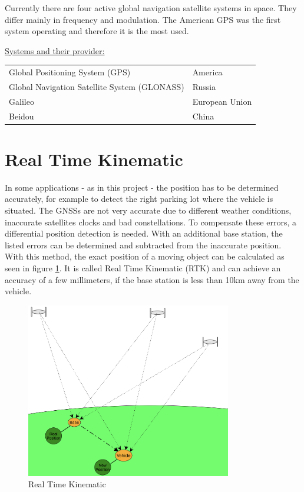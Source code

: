 Currently there are four active global navigation satellite systems in space. They differ mainly in frequency and modulation. The American GPS was the first system operating and therefore it is the most used. \cite{WsCommScript}

\newpage

\par
\underline{\large Systems and their provider:}\\

\begin{tabular}{ll}
	Global Positioning System (GPS) & America \\
	Global Navigation Satellite System (GLONASS) & Russia \\
	Galileo & European Union \\
	Beidou & China 
\end{tabular}

\section{Real Time Kinematic}

In some applications - as in this project - the position has to be determined accurately, for example to detect the right parking lot where the vehicle is situated. The GNSSs are not very accurate due to different weather conditions, inaccurate satellites clocks and bad constellations. To compensate these errors, a differential position detection is needed. With an additional base station, the listed errors can be determined and subtracted from the inaccurate position. With this method, the exact position of a moving object can be calculated as seen in figure \ref{fig:RTK}. It is called Real Time Kinematic (RTK) and can achieve an accuracy of a few millimeters, if the base station is less than 10\;km away from the vehicle. \cite{RTK} \cite{WsCommScript}

\begin{figure}[htb]
	\centering
	\includegraphics[width=0.8\textwidth]{images/RTK}
	\caption{Real Time Kinematic}
	\label{fig:RTK}
\end{figure}

